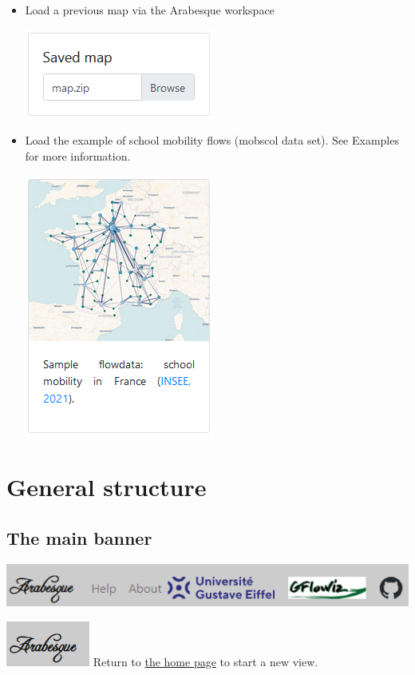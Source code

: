 \documentclass[
  letterpaper,
  DIV=11,
  numbers=noendperiod]{scrreprt}
\begin{document}
\begin{itemize}
\item
  Load a previous map via the Arabesque workspace

  \includegraphics{images/Arabesque_homepage_savemap.png}
\item
  Load the example of school mobility flows (mobscol data set). See
  Examples for more information.

  \includegraphics{images/Arabesque_homepage_sample.png}
\end{itemize}

\section{General structure}\label{general-structure}

\subsection{The main banner}\label{the-main-banner}

\includegraphics{images/main_banner.png}

\includegraphics{images/Buton_home.png} Return to
\href{https://arabesque.univ-eiffel.fr/}{the home page} to start a new
view.
\end{document}
